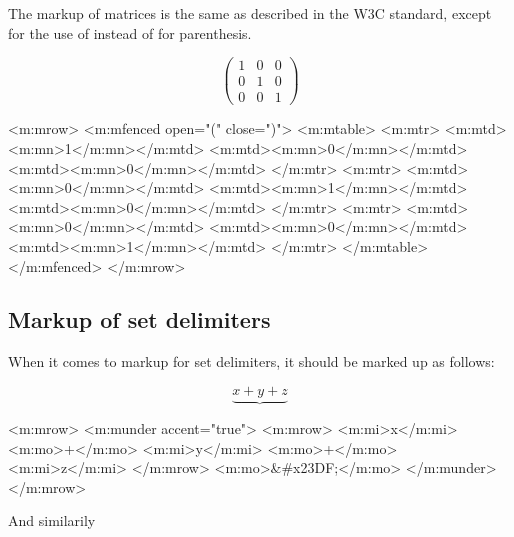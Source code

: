 \documentclass[english,a4paper,11pt]{article}
\begin{document}
\begin{eksempler}
The markup of matrices is the same as described in the W3C standard, except for the use of  instead of  for parenthesis.

\begin{eksempler}
	\begin{equation}
	\begin{pmatrix}
		1 & 0 & 0\\
		0 & 1 & 0\\
		0 & 0 & 1
	\end{pmatrix}
	\end{equation}

	\begin{kodeblokk}
	\begin{verbatimtab}[3]
		<m:mrow>
			<m:mfenced open="(" close=")">
				<m:mtable>
					<m:mtr>
						<m:mtd><m:mn>1</m:mn></m:mtd>
						<m:mtd><m:mn>0</m:mn></m:mtd>
						<m:mtd><m:mn>0</m:mn></m:mtd>
					</m:mtr>
					<m:mtr>
						<m:mtd><m:mn>0</m:mn></m:mtd>
						<m:mtd><m:mn>1</m:mn></m:mtd>
						<m:mtd><m:mn>0</m:mn></m:mtd>
					</m:mtr>
					<m:mtr>
						<m:mtd><m:mn>0</m:mn></m:mtd>
						<m:mtd><m:mn>0</m:mn></m:mtd>
						<m:mtd><m:mn>1</m:mn></m:mtd>
					</m:mtr>
				</m:mtable>
			</m:mfenced>
	  	</m:mrow>
	\end{verbatimtab}
	\end{kodeblokk}
\end{eksempler}

\subsection{Markup of set delimiters}

When it comes to markup for set delimiters, it should be marked up as follows:

\begin{eksempler}
	\begin{equation}
		\underbrace{x+y+z}
	\end{equation}

	\begin{kodeblokk}
	\begin{verbatimtab}[3]
		<m:mrow>
			<m:munder accent="true">
				<m:mrow>
					<m:mi>x</m:mi>
					<m:mo>+</m:mo>
					<m:mi>y</m:mi>
					<m:mo>+</m:mo>
					<m:mi>z</m:mi>
				</m:mrow>
				<m:mo>&#x23DF;</m:mo>
			</m:munder>
	  	</m:mrow>
	\end{verbatimtab}
	\end{kodeblokk}


And similarily


\end{eksempler}
\end{eksempler}
\end{document}
